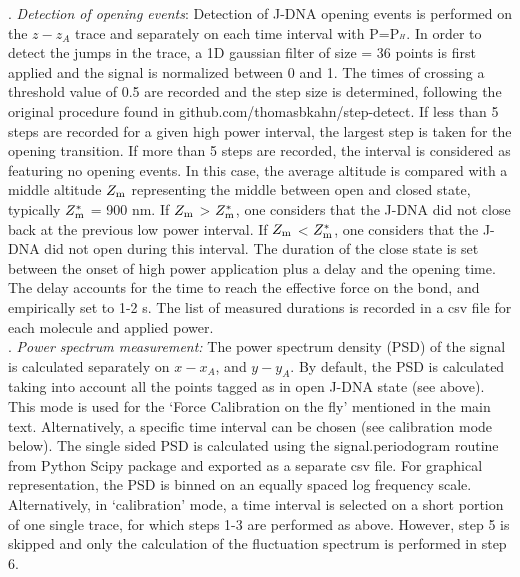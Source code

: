 \documentclass{biophys-new}
\begin{document}
. \textit{ Detection of opening events}: Detection of J-DNA opening events is performed on the $ z - z_A$ trace and separately on each time interval with P=P$_{^H}$. In order to detect the jumps in the trace, a 1D gaussian filter of size = 36 points is first applied and the signal is normalized between 0 and 1. %
The times of crossing a threshold value of 0.5 are recorded and the step size is determined, following the original procedure found in github.com/thomasbkahn/step-detect. If less than 5 steps are recorded for a given high power interval, the largest step is taken for the opening transition. If more than 5 steps are recorded, the interval is considered as featuring no opening events. In this case, the average altitude is compared with a middle altitude $Z_{\rm m}$ representing the middle between open and closed state, typically $Z^*_{\rm m}$  = 900 nm. If $Z_{\rm m}$ > $Z^*_{\rm m}$, one considers that the J-DNA did not close back at the previous low power interval. If $Z_{\rm m}$ < $Z^*_{\rm m}$, one considers that the J-DNA did not open during this interval. %
The duration of the close state is set between the onset of high power application plus a delay and the opening time. The delay accounts for the time to reach the effective force on the bond, and empirically set to 1-2 s. The list of measured durations is recorded in a csv file for each molecule and applied power.\\

. \textit{ Power spectrum measurement:}
The power spectrum density (PSD) of the signal is calculated separately on $x - x_A$, and $y - y_A$. By default, the PSD is calculated taking into account all the points tagged as in open J-DNA state (see above). This mode is used for the ‘Force Calibration on the fly’ mentioned in the main text. Alternatively, a specific time interval can be chosen (see calibration mode below). The single sided PSD is calculated using the signal.periodogram routine from Python Scipy package and exported as a separate csv file. For graphical representation, the PSD is binned on an equally spaced log frequency scale. %
Alternatively, in ‘calibration’ mode, a time interval is selected on a short portion of one single trace, for which steps 1-3 are performed as above. However, step 5 is skipped and only the calculation of the fluctuation spectrum is performed in step 6.\\
\end{document}
